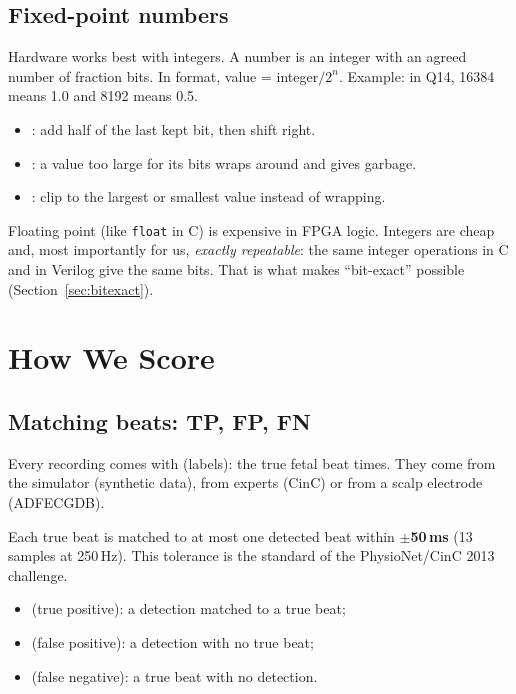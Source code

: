 \documentclass[11pt]{article}
\newcommand{\ttt}[1]{\texttt{#1}}
\begin{document}
\subsection{Fixed-point numbers}
\label{sec:fixedbasics}
Hardware works best with integers. A  number is an integer with an agreed number of fraction bits. In  format, value = integer$/2^n$. Example: in Q14, 16384 means 1.0 and 8192 means 0.5.
\begin{itemize}
  \item {}: add half of the last kept bit, then shift right.
  \item {}: a value too large for its bits wraps around and gives garbage.
  \item {}: clip to the largest or smallest value instead of wrapping.
\end{itemize}
Floating point (like \ttt{float} in C) is expensive in FPGA logic. Integers are cheap and, most importantly for us, \emph{exactly repeatable}: the same integer operations in C and in Verilog give the same bits. That is what makes ``bit-exact'' possible (Section~\ref{sec:bitexact}).

\section{How We Score}
\label{sec:scoring}

\subsection{Matching beats: TP, FP, FN}
Every recording comes with  (labels): the true fetal beat times. They come from the simulator (synthetic data), from experts (CinC) or from a scalp electrode (ADFECGDB).

Each true beat is matched to at most one detected beat within \textbf{$\pm$50\,ms} (13 samples at 250\,Hz). This tolerance is the standard of the PhysioNet/CinC 2013 challenge.
\begin{itemize}
  \item {} (true positive): a detection matched to a true beat;
  \item {} (false positive): a detection with no true beat;
  \item {} (false negative): a true beat with no detection.
\end{itemize}
\end{document}
